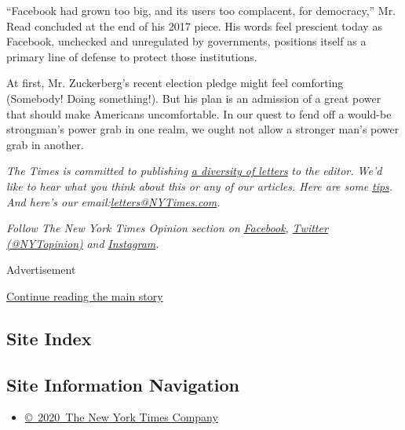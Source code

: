``Facebook had grown too big, and its users too complacent, for
democracy,'' Mr. Read concluded at the end of his 2017 piece. His words
feel prescient today as Facebook, unchecked and unregulated by
governments, positions itself as a primary line of defense to protect
those institutions.

At first, Mr. Zuckerberg's recent election pledge might feel comforting
(Somebody! Doing something!). But his plan is an admission of a great
power that should make Americans uncomfortable. In our quest to fend off
a would-be strongman's power grab in one realm, we ought not allow a
stronger man's power grab in another.

\emph{The Times is committed to publishing}
\href{https://www.nytimes3xbfgragh.onion/2019/01/31/opinion/letters/letters-to-editor-new-york-times-women.html}{\emph{a
diversity of letters}} \emph{to the editor. We'd like to hear what you
think about this or any of our articles. Here are some}
\href{https://help.nytimes3xbfgragh.onion/hc/en-us/articles/115014925288-How-to-submit-a-letter-to-the-editor}{\emph{tips}}\emph{.
And here's our
email:}\href{mailto:letters@NYTimes.com}{\emph{letters@NYTimes.com}}\emph{.}

\emph{Follow The New York Times Opinion section on}
\href{https://www.facebookcorewwwi.onion/nytopinion}{\emph{Facebook}}\emph{,}
\href{http://twitter.com/NYTOpinion}{\emph{Twitter (@NYTopinion)}}
\emph{and}
\href{https://www.instagram.com/nytopinion/}{\emph{Instagram}}\emph{.}

Advertisement

\protect\hyperlink{after-bottom}{Continue reading the main story}

\hypertarget{site-index}{%
\subsection{Site Index}\label{site-index}}

\hypertarget{site-information-navigation}{%
\subsection{Site Information
Navigation}\label{site-information-navigation}}

\begin{itemize}
\tightlist
\item
  \href{https://help.nytimes3xbfgragh.onion/hc/en-us/articles/115014792127-Copyright-notice}{©~2020~The
  New York Times Company}
\end{itemize}

